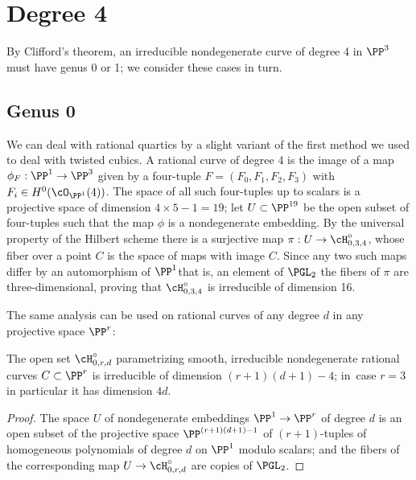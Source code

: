 \section{Degree 4}\label{degree 4 genus 0}

By Clifford's theorem, an irreducible nondegenerate curve of degree 4
in $\PP^{3}$ must have genus 0 or 1; we consider these cases in turn.

\subsection*{Genus 0}

We can deal with
rational quartics
%
by a slight variant of the first method
we used to deal with twisted cubics. A rational curve of degree 4 is the
image of a map $\phi_F : \PP^1 \to \PP^3$ given by a four-tuple $F =
(F_0,F_1,F_2,F_3)$ with $F_i \in H^0(\cO_{\PP^1}(4))$. The space of
all such four-tuples up to scalars is a projective space of dimension
$4 \times 5 - 1 = 19$; let $U \subset \PP^{19}$ be the open subset of
four-tuples such that the map $\phi$ is a nondegenerate embedding. By the
universal property of the Hilbert scheme there is a surjective map $\pi :
U \to \cH^\circ_{0,3,4}$, whose fiber over a point $C$ is the space of
%
maps with image $C$. Since any two such maps differ by an automorphism
%
of $\PP^1$\emdash that is, an element of 
$\PGL_2$
\emdash the fibers of $\pi$ are
three-dimensional, proving that $\cH^\circ_{0,3,4}$ is irreducible of
dimension 16.

The same analysis can be used on rational curves of any degree $d$
in any projective space $\PP^r$:

\begin{proposition}\label{dimension of rational curves}
The open set $\cH^\circ_{0,r,d}$ parametrizing smooth, irreducible
%
non\-degenerate rational curves $C \subset \PP^r$ is irreducible of
dimension $(r+1)(d+1)-4$; in~case $r=3$ in particular it has dimension
$4d$.
\end{proposition}

\begin{proof}
The space $U$ of nondegenerate embeddings $\PP^1 \to \PP^r$ of degree
$d$ is an open subset of the projective space $\PP^{(r+1)(d+1)-1}$ of
$(r+1)$-tuples of homogeneous polynomials of degree $d$ on $\PP^1$ modulo
scalars; and the fibers of the corresponding map $U \to \cH^\circ_{0,r,d}$
%
are copies of 
$\PGL_2$.
\end{proof}

